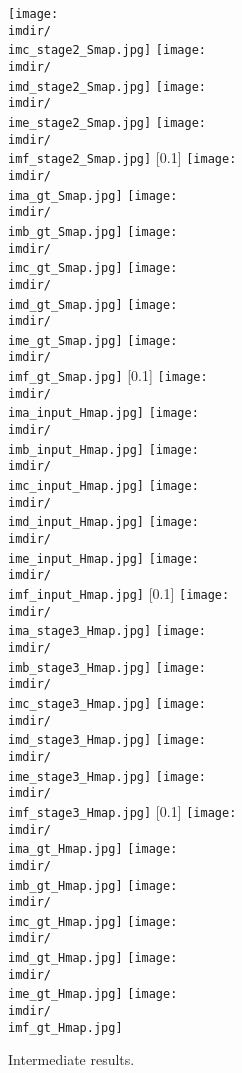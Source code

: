 \documentclass[runningheads]{llncs}
\begin{document}
\begin{figure*}[hthb]
{\texttt{[image: \\imdir/\\imc\_stage2\_Smap.jpg]}
\texttt{[image: \\imdir/\\imd\_stage2\_Smap.jpg]}
\texttt{[image: \\imdir/\\ime\_stage2\_Smap.jpg]}
\texttt{[image: \\imdir/\\imf\_stage2\_Smap.jpg]}
}
\subcaptionbox{}[0.1\linewidth]
{
\texttt{[image: \\imdir/\\ima\_gt\_Smap.jpg]}
\texttt{[image: \\imdir/\\imb\_gt\_Smap.jpg]}
\texttt{[image: \\imdir/\\imc\_gt\_Smap.jpg]}
\texttt{[image: \\imdir/\\imd\_gt\_Smap.jpg]}
\texttt{[image: \\imdir/\\ime\_gt\_Smap.jpg]}
\texttt{[image: \\imdir/\\imf\_gt\_Smap.jpg]}
}
\subcaptionbox{}[0.1\linewidth]
{
\texttt{[image: \\imdir/\\ima\_input\_Hmap.jpg]}
\texttt{[image: \\imdir/\\imb\_input\_Hmap.jpg]}
\texttt{[image: \\imdir/\\imc\_input\_Hmap.jpg]}
\texttt{[image: \\imdir/\\imd\_input\_Hmap.jpg]}
\texttt{[image: \\imdir/\\ime\_input\_Hmap.jpg]}
\texttt{[image: \\imdir/\\imf\_input\_Hmap.jpg]}
}
\subcaptionbox{}[0.1\linewidth]
{
\texttt{[image: \\imdir/\\ima\_stage3\_Hmap.jpg]}
\texttt{[image: \\imdir/\\imb\_stage3\_Hmap.jpg]}
\texttt{[image: \\imdir/\\imc\_stage3\_Hmap.jpg]}
\texttt{[image: \\imdir/\\imd\_stage3\_Hmap.jpg]}
\texttt{[image: \\imdir/\\ime\_stage3\_Hmap.jpg]}
\texttt{[image: \\imdir/\\imf\_stage3\_Hmap.jpg]}
}
\subcaptionbox{}[0.1\linewidth]
{
\texttt{[image: \\imdir/\\ima\_gt\_Hmap.jpg]}
\texttt{[image: \\imdir/\\imb\_gt\_Hmap.jpg]}
\texttt{[image: \\imdir/\\imc\_gt\_Hmap.jpg]}
\texttt{[image: \\imdir/\\imd\_gt\_Hmap.jpg]}
\texttt{[image: \\imdir/\\ime\_gt\_Hmap.jpg]}
\texttt{[image: \\imdir/\\imf\_gt\_Hmap.jpg]}
}
\caption{Intermediate results.}
\label{fig:im_result}
\end{figure*}



\newcommand{\hrdir}{figures/hr_details}
\newcommand{\hra}{a3427_1_4}
\newcommand{\hrb}{a0196_1_4}
\newcommand{\hrc}{a4732_1_1}
\newcommand{\hrd}{a3977_1_5}
\newcommand{\hre}{a4696_1_5}
\newcommand{\hrf}{a0249_1_5}
\newcommand{\hrg}{a0779_1_3}
\newcommand{\hrh}{a1580_1_4}
\end{document}
